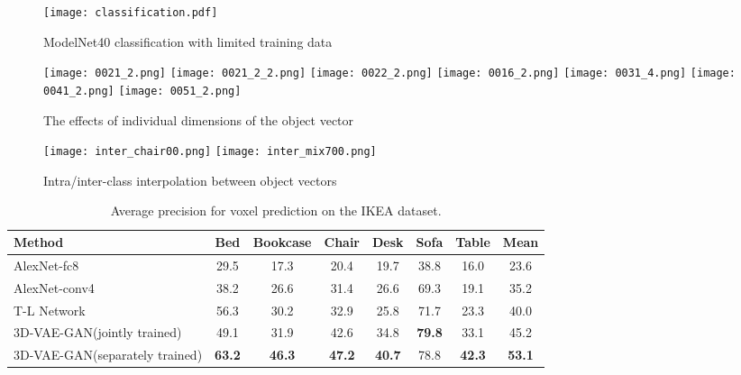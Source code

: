 \documentclass{article}
\newcommand{\vaemodel}{3D-VAE-GAN\xspace}
\begin{document}
\begin{figure}[t]
\begin{minipage}[m]{0.32\linewidth}
\texttt{[image: classification.pdf]}
\vspace{-15pt}
\caption{ModelNet40 classification with limited training data}
\label{fig:datasize}
\end{minipage}
\hfill
\begin{minipage}[m]{0.66\linewidth}
\centering
\texttt{[image: 0021\_2.png]} 
\texttt{[image: 0021\_2\_2.png]} 
\texttt{[image: 0022\_2.png]} 
\texttt{[image: 0016\_2.png]} 
\texttt{[image: 0031\_4.png]} 
\texttt{[image: 0041\_2.png]} 
\texttt{[image: 0051\_2.png]} 
\vspace{-2pt}
\caption{The effects of individual dimensions of the object vector}
\label{fig:visvect}
\vspace{7pt}
\texttt{[image: inter\_chair00.png]}
\texttt{[image: inter\_mix700.png]}
\vspace{-20pt}
\caption{Intra/inter-class interpolation between object vectors}
\label{fig:interp}
\end{minipage}
\vspace{-15pt}
\end{figure}

\begin{table}[t]
\small
\begin{center}
\begin{tabular}{lccccccc}
\toprule
Method & Bed & Bookcase & Chair & Desk & Sofa & Table & Mean \\
\midrule
AlexNet-fc8~\citep{girdhar2016learning} & 29.5 & 17.3 & 20.4 & 19.7 & 38.8 & 16.0 & 23.6 \\
AlexNet-conv4~\citep{girdhar2016learning} & 38.2 & 26.6 & 31.4 & 26.6 & 69.3 & 19.1 & 35.2 \\
T-L Network~\citep{girdhar2016learning} & 56.3 & 30.2 & 32.9 & 25.8 & 71.7 & 23.3 & 40.0 \\
\midrule
\vaemodel (jointly trained) & 49.1 & 31.9 & 42.6 & 34.8 & {\bf 79.8} & 33.1 & 45.2\\
\vaemodel (separately trained) & {\bf 63.2} & {\bf 46.3} & {\bf 47.2} &{\bf 40.7}  &  78.8 & {\bf 42.3} & {\bf 53.1}\\
\bottomrule
\end{tabular}
\end{center}
\caption{Average precision for voxel prediction on the IKEA dataset.}
\label{tbl:ikea}
\vspace{-15pt}
\end{table}
\end{document}
